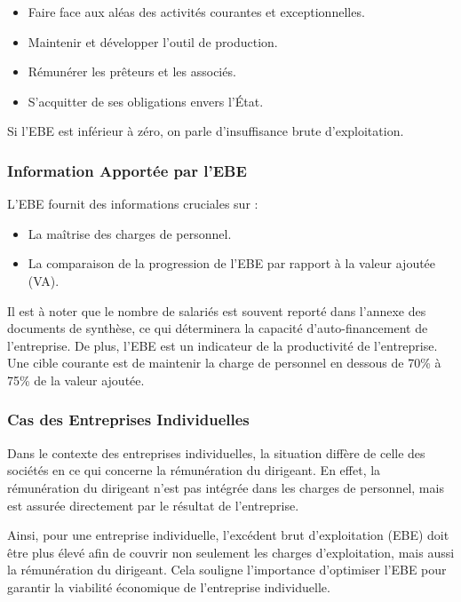 \documentclass[a4paper, 12pt]{report}
\begin{document}
\begin{itemize}
	\item Faire face aux aléas des activités courantes et exceptionnelles.
	\item Maintenir et développer l'outil de production.
	\item Rémunérer les prêteurs et les associés.
	\item S'acquitter de ses obligations envers l'État.
\end{itemize}

Si l'EBE est inférieur à zéro, on parle d'insuffisance brute d'exploitation.

\subsubsection{Information Apportée par l'EBE}

L'EBE fournit des informations cruciales sur :

\begin{itemize}
	\item La maîtrise des charges de personnel.
	\item La comparaison de la progression de l'EBE par rapport à la valeur ajoutée (VA).
\end{itemize}

Il est à noter que le nombre de salariés est souvent reporté dans l'annexe des documents de synthèse, ce qui déterminera la capacité d'auto-financement de l'entreprise. De plus, l'EBE est un indicateur de la productivité de l'entreprise. Une cible courante est de maintenir la charge de personnel en dessous de 70\% à 75\% de la valeur ajoutée.

\subsubsection{Cas des Entreprises Individuelles}

Dans le contexte des entreprises individuelles, la situation diffère de celle des sociétés en ce qui concerne la rémunération du dirigeant. En effet, la rémunération du dirigeant n'est pas intégrée dans les charges de personnel, mais est assurée directement par le résultat de l'entreprise.

Ainsi, pour une entreprise individuelle, l'excédent brut d'exploitation (EBE) doit être plus élevé afin de couvrir non seulement les charges d'exploitation, mais aussi la rémunération du dirigeant. Cela souligne l'importance d'optimiser l'EBE pour garantir la viabilité économique de l'entreprise individuelle.
\end{document}
